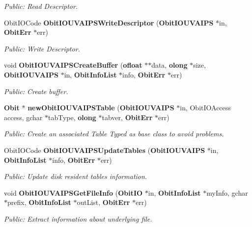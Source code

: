 \begin{CompactItemize}
\begin{CompactList}\small\item\em Public: Read Descriptor. \item\end{CompactList}\item 
Obit\-IOCode {\bf Obit\-IOUVAIPSWrite\-Descriptor} ({\bf Obit\-IOUVAIPS} $\ast$in, {\bf Obit\-Err} $\ast$err)
\begin{CompactList}\small\item\em Public: Write Descriptor. \item\end{CompactList}\item 
void {\bf Obit\-IOUVAIPSCreate\-Buffer} ({\bf ofloat} $\ast$$\ast$data, {\bf olong} $\ast$size, {\bf Obit\-IOUVAIPS} $\ast$in, {\bf Obit\-Info\-List} $\ast$info, {\bf Obit\-Err} $\ast$err)
\begin{CompactList}\small\item\em Public: Create buffer. \item\end{CompactList}\item 
{\bf Obit} $\ast$ {\bf new\-Obit\-IOUVAIPSTable} ({\bf Obit\-IOUVAIPS} $\ast$in, Obit\-IOAccess access, gchar $\ast$tab\-Type, {\bf olong} $\ast$tabver, {\bf Obit\-Err} $\ast$err)
\begin{CompactList}\small\item\em Public: Create an associated Table Typed as base class to avoid problems. \item\end{CompactList}\item 
Obit\-IOCode {\bf Obit\-IOUVAIPSUpdate\-Tables} ({\bf Obit\-IOUVAIPS} $\ast$in, {\bf Obit\-Info\-List} $\ast$info, {\bf Obit\-Err} $\ast$err)
\begin{CompactList}\small\item\em Public: Update disk resident tables information. \item\end{CompactList}\item 
void {\bf Obit\-IOUVAIPSGet\-File\-Info} ({\bf Obit\-IO} $\ast$in, {\bf Obit\-Info\-List} $\ast$my\-Info, gchar $\ast$prefix, {\bf Obit\-Info\-List} $\ast$out\-List, {\bf Obit\-Err} $\ast$err)
\begin{CompactList}\small\item\em Public: Extract information about underlying file. \item\end{CompactList}\end{CompactItemize}



